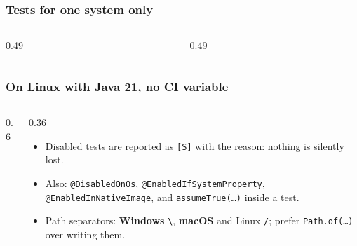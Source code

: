 \documentclass[aspectratio=169,10pt,compress]{beamer}
\newcommand{\win}{\textbf{Windows}}
\newcommand{\mac}{\textbf{macOS}}
\begin{document}




\begin{frame}[t,fragile] \frametitle{Tests for one system only}
  \begin{columns}[T]
    \begin{column}{0.49\textwidth}
    \end{column}
    \begin{column}{0.49\textwidth}
    \end{column}
  \end{columns}
\end{frame}




\begin{frame}[t,fragile] \frametitle{On Linux with Java 21, no CI variable}
  \begin{columns}[T]
    \begin{column}{0.6\textwidth}
    \end{column}
    \begin{column}{0.36\textwidth}
      \begin{itemize}\small
        \item Disabled tests are reported as \texttt{[S]} with the reason: nothing is silently lost.
        \item Also: \texttt{@DisabledOnOs}, \texttt{@EnabledIfSystemProperty}, \texttt{@EnabledInNativeImage}, and \texttt{assumeTrue(\dots)} inside a test.
        \item Path separators: \win{} \texttt{\textbackslash}, \mac{} and Linux \texttt{/}; prefer \texttt{Path.of(\dots)} over writing them.
      \end{itemize}
    \end{column}
  \end{columns}
\end{frame}

\end{document}
